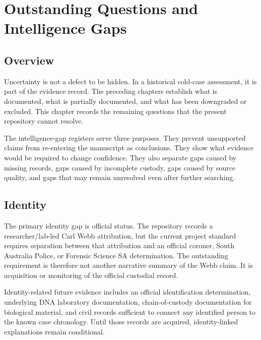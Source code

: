 \chapter{Outstanding Questions and Intelligence Gaps}
\label{chap:outstanding-questions-and-intelligence-gaps}


\section{Overview}

Uncertainty is not a defect to be hidden. In a historical cold-case assessment, it is part of the evidence record. The preceding chapters establish what is documented, what is partially documented, and what has been downgraded or excluded. This chapter records the remaining questions that the present repository cannot resolve.

The intelligence-gap registers serve three purposes. They prevent unsupported claims from re-entering the manuscript as conclusions. They show what evidence would be required to change confidence. They also separate gaps caused by missing records, gaps caused by incomplete custody, gaps caused by source quality, and gaps that may remain unresolved even after further searching.

\section{Identity}

The primary identity gap is official status. The repository records a researcher/lab-led Carl Webb attribution, but the current project standard requires separation between that attribution and an official coroner, South Australia Police, or Forensic Science SA determination. The outstanding requirement is therefore not another narrative summary of the Webb claim. It is acquisition or monitoring of the official custodial record.

Identity-related future evidence includes an official identification determination, underlying DNA laboratory documentation, chain-of-custody documentation for biological material, and civil records sufficient to connect any identified person to the known case chronology. Until those records are acquired, identity-linked explanations remain conditional.

